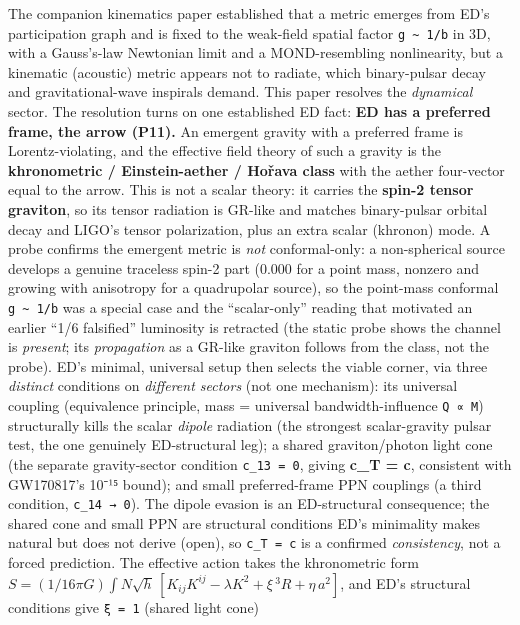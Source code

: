 \documentclass[
]{article}
\begin{document}
The companion kinematics paper established that a metric emerges from
ED's participation graph and is fixed to the weak-field spatial factor
\texttt{g\ \textasciitilde{}\ 1/b} in 3D, with a Gauss's-law Newtonian
limit and a MOND-resembling nonlinearity, but a kinematic (acoustic)
metric appears not to radiate, which binary-pulsar decay and
gravitational-wave inspirals demand. This paper resolves the
\emph{dynamical} sector. The resolution turns on one established ED
fact: \textbf{ED has a preferred frame, the arrow (P11).} An emergent
gravity with a preferred frame is Lorentz-violating, and the effective
field theory of such a gravity is the \textbf{khronometric /
Einstein-aether / Hořava class} with the aether four-vector equal to the
arrow. This is not a scalar theory: it carries the \textbf{spin-2 tensor
graviton}, so its tensor radiation is GR-like and matches binary-pulsar
orbital decay and LIGO's tensor polarization, plus an extra scalar
(khronon) mode. A probe confirms the emergent metric is \emph{not}
conformal-only: a non-spherical source develops a genuine traceless
spin-2 part (0.000 for a point mass, nonzero and growing with anisotropy
for a quadrupolar source), so the point-mass conformal
\texttt{g\ \textasciitilde{}\ 1/b} was a special case and the
``scalar-only'' reading that motivated an earlier ``1/6 falsified''
luminosity is retracted (the static probe shows the channel is
\emph{present}; its \emph{propagation} as a GR-like graviton follows
from the class, not the probe). ED's minimal, universal setup then
selects the viable corner, via three \emph{distinct} conditions on
\emph{different sectors} (not one mechanism): its universal coupling
(equivalence principle, mass = universal bandwidth-influence
\texttt{Q\ ∝\ M}) structurally kills the scalar \emph{dipole} radiation
(the strongest scalar-gravity pulsar test, the one genuinely
ED-structural leg); a shared graviton/photon light cone (the separate
gravity-sector condition \texttt{c\_13\ =\ 0}, giving \textbf{c\_T = c},
consistent with GW170817's 10⁻¹⁵ bound); and small preferred-frame PPN
couplings (a third condition, \texttt{c\_14\ →\ 0}). The dipole evasion
is an ED-structural consequence; the shared cone and small PPN are
structural conditions ED's minimality makes natural but does not derive
(open), so \texttt{c\_T\ =\ c} is a confirmed \emph{consistency}, not a
forced prediction. The effective action takes the khronometric form
\(S = (1/16\pi G)\int N\sqrt{h}\,[K_{ij}K^{ij} - \lambda K^2 + \xi\,{}^3R + \eta\,a^2]\),
and ED's structural conditions give \texttt{ξ\ =\ 1} (shared light cone)
\end{document}
